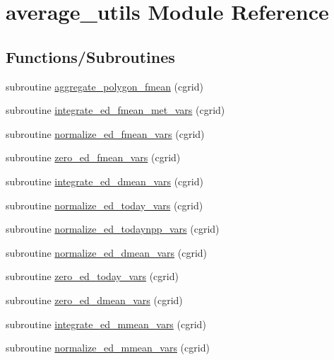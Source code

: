 \hypertarget{namespaceaverage__utils}{}\section{average\+\_\+utils Module Reference}
\label{namespaceaverage__utils}
\subsection*{Functions/\+Subroutines}
\begin{DoxyCompactItemize}
\item 
subroutine \hyperlink{namespaceaverage__utils_a90965230835c19a82d90127089235c76}{aggregate\+\_\+polygon\+\_\+fmean} (cgrid)
\item 
subroutine \hyperlink{namespaceaverage__utils_acf7868319b9242daa7eea553b25f2899}{integrate\+\_\+ed\+\_\+fmean\+\_\+met\+\_\+vars} (cgrid)
\item 
subroutine \hyperlink{namespaceaverage__utils_a662a31926be61beb22be003b5ec40343}{normalize\+\_\+ed\+\_\+fmean\+\_\+vars} (cgrid)
\item 
subroutine \hyperlink{namespaceaverage__utils_a40f7a4a46972fb6b9c0fe90fdc73a173}{zero\+\_\+ed\+\_\+fmean\+\_\+vars} (cgrid)
\item 
subroutine \hyperlink{namespaceaverage__utils_a985b401d85dd857f44371dd2c3e7c40c}{integrate\+\_\+ed\+\_\+dmean\+\_\+vars} (cgrid)
\item 
subroutine \hyperlink{namespaceaverage__utils_a538e2e59c7c2889ae624b6e1d2a9e5f2}{normalize\+\_\+ed\+\_\+today\+\_\+vars} (cgrid)
\item 
subroutine \hyperlink{namespaceaverage__utils_a446f9090fbbcf3eb12f4b9231d946e89}{normalize\+\_\+ed\+\_\+todaynpp\+\_\+vars} (cgrid)
\item 
subroutine \hyperlink{namespaceaverage__utils_a2203ebc403bfd01a55cf7aac61777819}{normalize\+\_\+ed\+\_\+dmean\+\_\+vars} (cgrid)
\item 
subroutine \hyperlink{namespaceaverage__utils_a6a92d00bf7112b127a596bd765cc12c6}{zero\+\_\+ed\+\_\+today\+\_\+vars} (cgrid)
\item 
subroutine \hyperlink{namespaceaverage__utils_af1a2224da3c590c5645db8efa5c16c9f}{zero\+\_\+ed\+\_\+dmean\+\_\+vars} (cgrid)
\item 
subroutine \hyperlink{namespaceaverage__utils_a24f0cd542ec9741c1bcc76e640498cd2}{integrate\+\_\+ed\+\_\+mmean\+\_\+vars} (cgrid)
\item 
subroutine \hyperlink{namespaceaverage__utils_afce18c59b2e9d5605d22e4d356934bdb}{normalize\+\_\+ed\+\_\+mmean\+\_\+vars} (cgrid)

\end{DoxyCompactItemize}
